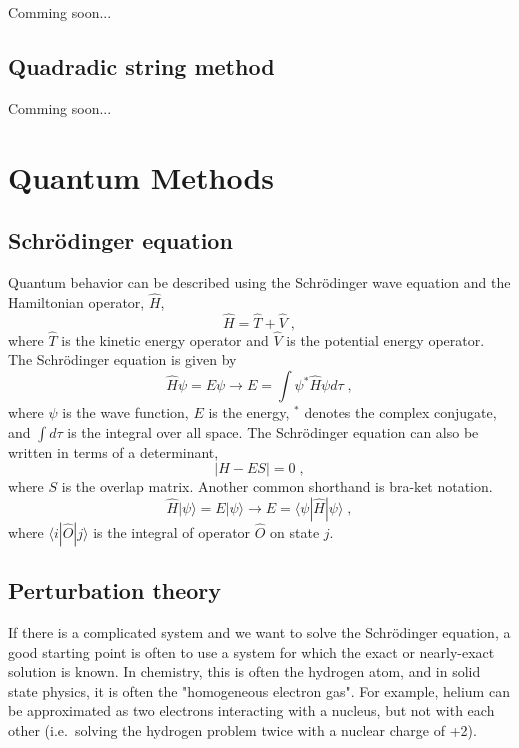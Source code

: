 \documentclass[12pt]{report}
\begin{document}
{\color{red}Comming soon...}

\subsection{Quadradic string method}

{\color{red}Comming soon...}

\section{Quantum Methods}

\subsection{Schr\"{o}dinger equation}

Quantum behavior can be described using the Schr\"{o}dinger wave equation and
the Hamiltonian operator, $\hat H$,
\begin{equation}
 \hat H = \hat T + \hat V \; ,
\end{equation}
where $\hat T$ is the kinetic energy operator and $\hat V$ is the potential
energy operator.
The Schr\"{o}dinger equation is given by
\begin{equation}
 \hat H\psi = E\psi \to E = \int \psi^*\hat H\psi d\tau \; ,
\end{equation}
where $\psi$ is the wave function, $E$ is the energy, $^*$ denotes the complex
conjugate, and $\int d\tau$ is the integral over all space.
The Schr\"{o}dinger equation can also be written in terms of a determinant,
\begin{equation}
 |H-ES| = 0 \; ,
\end{equation}
where $S$ is the overlap matrix.
Another common shorthand is bra-ket notation.
\begin{equation}
 \hat H|\psi\rangle = E|\psi\rangle \to E=\langle\psi|\hat H|\psi\rangle \; ,
\end{equation}
where $\langle i|\hat O|j\rangle$ is the integral of operator $\hat O$ on
state $j$.

\subsection{Perturbation theory}

If there is a complicated system and we want to solve the Schr\"{o}dinger
equation, a good starting point is often to use a system for which the exact
or nearly-exact solution is known.
In chemistry, this is often the hydrogen atom, and in solid state physics, it
is often the "homogeneous electron gas".
For example, helium can be approximated as two electrons interacting with a
nucleus, but not with each other (i.e.\ solving the hydrogen problem twice
with a nuclear charge of +2). \\
\end{document}
